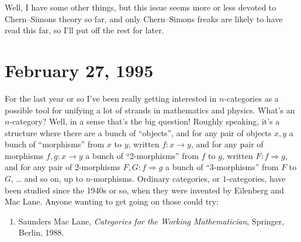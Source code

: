 \documentclass{article}
\def\tightlist{}
\begin{document}
Well, I have some other things, but this issue seems more or less
devoted to Chern--Simons theory so far, and only Chern--Simons freaks are
likely to have read this far, so I'll put off the rest for later.



\hypertarget{week49}{%
\section{February 27, 1995}\label{week49}}

For the last year or so I've been really getting interested in
\(n\)-categories as a possible tool for unifying a lot of strands in
mathematics and physics. What's an \(n\)-category? Well, in a sense
that's the big question! Roughly speaking, it's a structure where there
are a bunch of ``objects'', and for any pair of objects \(x,y\) a bunch
of ``morphisms'' from \(x\) to \(y\), written \(f\colon x \to y\), and
for any pair of morphisms \(f, g\colon x \to y\) a bunch of
``2-morphisms'' from \(f\) to \(g\), written
\(F\colon f \Rightarrow g\), and for any pair of \(2\)-morphisms
\(F, G\colon f \Rightarrow g\) a bunch of ``3-morphisms'' from \(F\) to
\(G\), \ldots{} and so on, up to \(n\)-morphisms. Ordinary categories,
or \(1\)-categories, have been studied since the 1940s or so, when they
were invented by Eilenberg and Mac Lane. Anyone wanting to get going on
those could try:

\begin{enumerate}
\def\labelenumi{\arabic{enumi})}
\tightlist
\item
  Saunders Mac Lane, \emph{Categories for the Working Mathematician},
  Springer, Berlin, 1988.
\end{enumerate}
\end{document}
